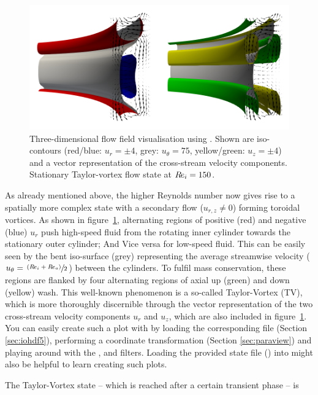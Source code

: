 \documentclass[a4paper, 11pt, DIV=11]{scrartcl}
\begin{document}
\begin{figure}
\includegraphics[width=1.00\textwidth]{figures/tc0041/vectorPlot.png}
\caption{Three-dimensional flow field visualisation using  \paraview.
Shown are iso-contours (red/blue: $u_{r}=\pm\num{4}$, grey:
$u_{\theta}=\num{75}$, yellow/green: $u_{z}=\pm\num{4}$) and a vector
representation of the cross-stream velocity components. Stationary
Taylor-vortex flow state at $R\hspace{-0.1em}e_{i}=\num{150}$.}
\label{fig:tc0041vectorPlot}
\end{figure}
As already mentioned above, the higher Reynolds number now gives rise
to a spatially more complex state with a secondary flow ($u_{r,z}\neq\num{0}$)
forming toroidal vortices. As shown in figure~\ref{fig:tc0041vectorPlot},
alternating regions of positive (red) and negative (blue) $u_r$ push high-speed
fluid from the rotating inner cylinder towards the stationary outer cylinder;
And Vice versa for low-speed fluid. This can be easily seen by the bent
iso-surface (grey) representing the average streamwise velocity
($u_{\theta}=\sfrac{\left(R\hspace{-0.1em}e_{i}+R\hspace{-0.1em}e_{o}\right)}{2}$) between the cylinders.
To fulfil mass conservation, these regions are flanked by four alternating regions of
axial up (green) and down (yellow) wash. This well-known phenomenon is a so-called
Taylor-Vortex (TV), which is more thoroughly discernible through the vector representation
of the two cross-stream velocity components $u_{r}$ and $u_{z}$, which are also included
in figure~\ref{fig:tc0041vectorPlot}. You can easily create such a plot with \paraview
by loading the corresponding  file (Section \ref{sec:iohdf5}), performing a
coordinate transformation (Section \ref{sec:paraview}) and playing around with the
,  and  filters. Loading the provided state file
() into \paraview might also be helpful to
learn creating such plots.
\par
The Taylor-Vortex state -- which is reached after a certain transient phase -- is
\end{document}
